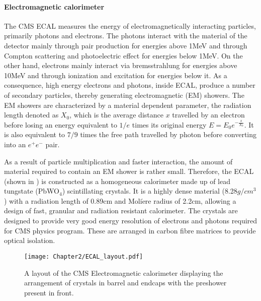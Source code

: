 \paragraph{Electromagnetic calorimeter}
\hspace{\parindent}
The CMS ECAL measures the energy of electromagnetically interacting particles, primarily photons and electrons. The photons interact with the material of the detector
mainly through pair production for energies above 1\unit{MeV} and through Compton scattering and photoelectric effect for energies below 1\unit{MeV}.
On the other hand, electrons mainly interact via bremsstrahlung for energies above 10\unit{MeV} and through ionization and excitation for energies below it.
As a consequence, high energy electrons and photons, inside ECAL, produce a number of secondary particles, thereby generating electromagnetic (EM) showers.
The EM showers are characterized by a material dependent parameter, the radiation length denoted as $X_{0}$, which is the average distance $x$ travelled by an electron
before losing an energy equivalent to $1/e$ times its original energy \ie $E = E_{0}e^{-\frac{x}{X_{0}}}$.
It is also equivalent to $7/9$ times the free path travelled by photon before converting into an $e^{+}e^{-}$ pair.

As a result of particle multiplication and faster interaction, the amount of material required to contain an EM shower is rather small. Therefore,
the ECAL~\cite{Chatrchyan:2008aa, ecalTDR} (shown in \fig{\ref{fig:ECAL}})
is constructed as a homogeneous calorimeter made up of lead tungstate (PbWO$_{4}$) scintillating crystals.
It is a highly dense material (8.28$\unit{g/{cm}^{3}}$) with a radiation length of 0.89\unit{cm} and Moli$\grave{\textrm{e}}$re radius of 2.2\unit{cm},
allowing a design of fast, granular and radiation resistant calorimeter.
The crystals are designed to provide very good energy resolution of electrons and photons required for CMS physics program. 
These are arranged in carbon fibre matrices to provide optical isolation.  


\begin{figure}[h]
\begin{center}
\texttt{[image: Chapter2/ECAL\_layout.pdf]}
\caption{A layout of the CMS Electromagnetic calorimeter displaying the arrangement of crystals in barrel and endcaps with the preshower present in front.}
\label{fig:ECAL}
\end{center}
\end{figure}
\vspace{-0.3in}

